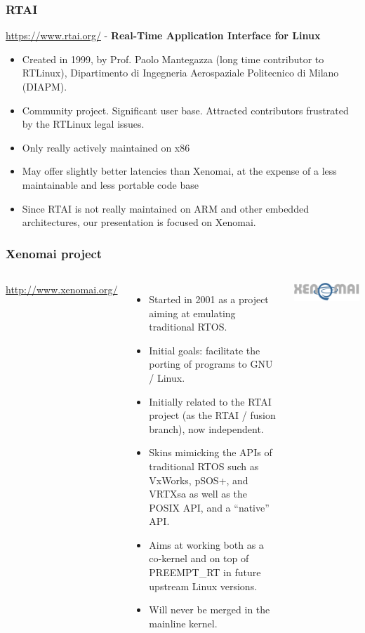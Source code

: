 \begin{frame}
  \frametitle{RTAI}
  \url{https://www.rtai.org/} - {\bf Real-Time Application Interface for Linux}
  \begin{itemize}
  \item Created in 1999, by Prof. Paolo Mantegazza (long time
    contributor to RTLinux), Dipartimento di Ingegneria Aerospaziale
    Politecnico di Milano (DIAPM).
  \item Community project. Significant user base. Attracted
    contributors frustrated by the RTLinux legal issues.
  \item Only really actively maintained on x86
  \item May offer slightly better latencies than Xenomai, at the
    expense of a less maintainable and less portable code base
  \item Since RTAI is not really maintained on ARM and other embedded
    architectures, our presentation is focused on Xenomai.
  \end{itemize}
\end{frame}

\begin{frame}
  \frametitle{Xenomai project}
  \begin{columns}[T]
    \url{http://www.xenomai.org/}
    \begin{itemize}
    \item Started in 2001 as a project aiming at emulating traditional
      RTOS.
    \item Initial goals: facilitate the porting of programs to GNU /
      Linux.
    \item Initially related to the RTAI project (as the RTAI / fusion
      branch), now independent.
    \item Skins mimicking the APIs of traditional RTOS such as
      VxWorks, pSOS+, and VRTXsa as well as the POSIX API, and a
      “native” API.
    \item Aims at working both as a co-kernel and on top of
      PREEMPT\_RT in future upstream Linux versions.
    \item Will never be merged in the mainline kernel.
    \end{itemize}
    \includegraphics[width=\textwidth]{slides/sysdev-realtime/xenomai.png}
  \end{columns}
\end{frame}

